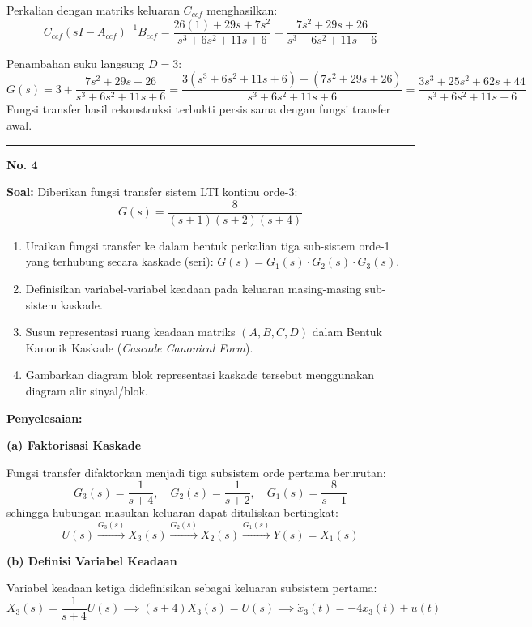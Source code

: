\documentclass[11pt,a4paper]{article}
\begin{document}
Perkalian dengan matriks keluaran $C_{ccf}$ menghasilkan:
$$C_{ccf} (sI - A_{ccf})^{-1} B_{ccf} = \frac{26(1) + 29s + 7s^2}{s^3 + 6s^2 + 11s + 6} = \frac{7s^2 + 29s + 26}{s^3 + 6s^2 + 11s + 6}$$

Penambahan suku langsung $D = 3$:
$$G(s) = 3 + \frac{7s^2 + 29s + 26}{s^3 + 6s^2 + 11s + 6} = \frac{3(s^3 + 6s^2 + 11s + 6) + (7s^2 + 29s + 26)}{s^3 + 6s^2 + 11s + 6} = \frac{3s^3 + 25s^2 + 62s + 44}{s^3 + 6s^2 + 11s + 6}$$
Fungsi transfer hasil rekonstruksi terbukti persis sama dengan fungsi transfer awal.

\vspace{12pt}
\hrule
\vspace{10pt}

\textbf{\large No. 4}

\textbf{Soal:}  
Diberikan fungsi transfer sistem LTI kontinu orde-3:
$$G(s) = \frac{8}{(s+1)(s+2)(s+4)}$$
\begin{enumerate}[label=(\alph*)]
    \item Uraikan fungsi transfer ke dalam bentuk perkalian tiga sub-sistem orde-1 yang terhubung secara kaskade (seri): $G(s) = G_1(s) \cdot G_2(s) \cdot G_3(s)$.
    \item Definisikan variabel-variabel keadaan pada keluaran masing-masing sub-sistem kaskade.
    \item Susun representasi ruang keadaan matriks $(A, B, C, D)$ dalam Bentuk Kanonik Kaskade (\textit{Cascade Canonical Form}).
    \item Gambarkan diagram blok representasi kaskade tersebut menggunakan diagram alir sinyal/blok.
\end{enumerate}

\textbf{Penyelesaian:}

\textbf{(a) Faktorisasi Kaskade}

Fungsi transfer difaktorkan menjadi tiga subsistem orde pertama berurutan:
$$G_3(s) = \frac{1}{s+4}, \quad G_2(s) = \frac{1}{s+2}, \quad G_1(s) = \frac{8}{s+1}$$
sehingga hubungan masukan-keluaran dapat dituliskan bertingkat:
$$U(s) \xrightarrow{G_3(s)} X_3(s) \xrightarrow{G_2(s)} X_2(s) \xrightarrow{G_1(s)} Y(s) = X_1(s)$$

\textbf{(b) Definisi Variabel Keadaan}

Variabel keadaan ketiga didefinisikan sebagai keluaran subsistem pertama:
$$X_3(s) = \frac{1}{s+4} U(s) \implies (s+4)X_3(s) = U(s) \implies \dot{x}_3(t) = -4x_3(t) + u(t)$$
\end{document}
